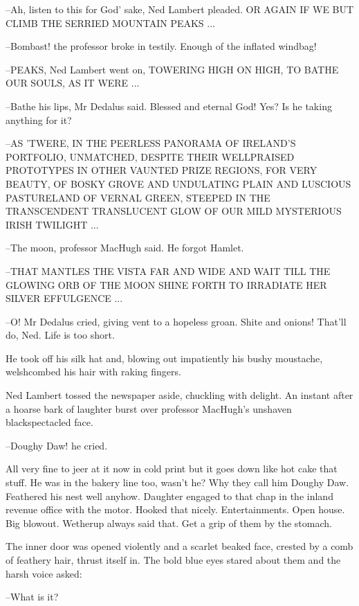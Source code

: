 --Ah, listen to this for God' sake, Ned Lambert pleaded. OR AGAIN IF WE
BUT CLIMB THE SERRIED MOUNTAIN PEAKS ...

--Bombast! the professor broke in testily. Enough of the inflated
windbag!

--PEAKS, Ned Lambert went on, TOWERING HIGH ON HIGH, TO BATHE OUR SOULS,
AS IT WERE ...

--Bathe his lips, Mr Dedalus said. Blessed and eternal God! Yes? Is he
taking anything for it?

--AS 'TWERE, IN THE PEERLESS PANORAMA OF IRELAND'S PORTFOLIO, UNMATCHED,
DESPITE THEIR WELLPRAISED PROTOTYPES IN OTHER VAUNTED PRIZE REGIONS, FOR
VERY BEAUTY, OF BOSKY GROVE AND UNDULATING PLAIN AND LUSCIOUS PASTURELAND
OF VERNAL GREEN, STEEPED IN THE TRANSCENDENT TRANSLUCENT GLOW OF OUR MILD
MYSTERIOUS IRISH TWILIGHT ...



--The moon, professor MacHugh said. He forgot Hamlet.

--THAT MANTLES THE VISTA FAR AND WIDE AND WAIT TILL THE GLOWING ORB OF
THE MOON SHINE FORTH TO IRRADIATE HER SILVER EFFULGENCE ...

--O! Mr Dedalus cried, giving vent to a hopeless groan. Shite and onions!
That'll do, Ned. Life is too short.

He took off his silk hat and, blowing out impatiently his bushy
moustache, welshcombed his hair with raking fingers.

Ned Lambert tossed the newspaper aside, chuckling with delight. An
instant after a hoarse bark of laughter burst over professor MacHugh's
unshaven blackspectacled face.

--Doughy Daw! he cried.



All very fine to jeer at it now in cold print but it goes down like hot
cake that stuff. He was in the bakery line too, wasn't he? Why they call
him Doughy Daw. Feathered his nest well anyhow. Daughter engaged to that
chap in the inland revenue office with the motor. Hooked that nicely.
Entertainments. Open house. Big blowout. Wetherup always said that. Get
a grip of them by the stomach.

The inner door was opened violently and a scarlet beaked face,
crested by a comb of feathery hair, thrust itself in. The bold blue eyes
stared about them and the harsh voice asked:

--What is it?

